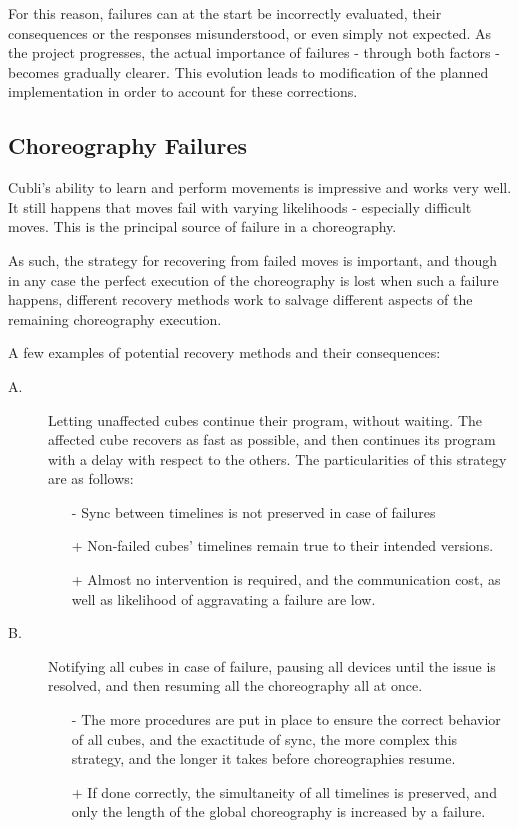 For this reason, failures can at the start be incorrectly evaluated, their consequences or the responses misunderstood, or even simply not expected. As the project progresses, the actual importance of failures - through both factors - becomes gradually clearer.  This evolution leads to modification of the planned implementation in order to account for these corrections.

\subsection{Choreography Failures}

Cubli's ability to learn and perform movements is impressive and works very well. It still happens that moves fail with varying likelihoods - especially difficult moves. This is the principal source of failure in a choreography.

As such, the strategy for recovering from failed moves is important, and though in any case the perfect execution of the choreography is lost when such a failure happens, different recovery methods work to salvage different aspects of the remaining choreography execution.

A few examples of potential recovery methods and their consequences:\\

\begin{description}
\item[A.] Letting unaffected cubes continue their program, without waiting. The affected cube recovers as fast as possible, and then continues its program with a delay with respect to the others.
The particularities of this strategy are as follows:

\begin{itemize}
\item[-] Sync between timelines is not preserved in case of failures
\item[+] Non-failed cubes' timelines remain true to their intended versions.
\item[+] Almost no intervention is required, and the communication cost, as well as likelihood of aggravating a failure are low.
\end{itemize}

\item[B.] Notifying all cubes in case of failure, pausing all devices until the issue is resolved, and then resuming all the choreography all at once.

\begin{itemize}
\item[-] The more procedures are put in place to ensure the correct behavior of all cubes, and the exactitude of sync, the more complex this strategy, and the longer it takes before choreographies resume. 
\item[+] If done correctly, the simultaneity of all timelines is preserved, and only the length of the global choreography is increased by a failure.
\end{itemize}

\end{description}